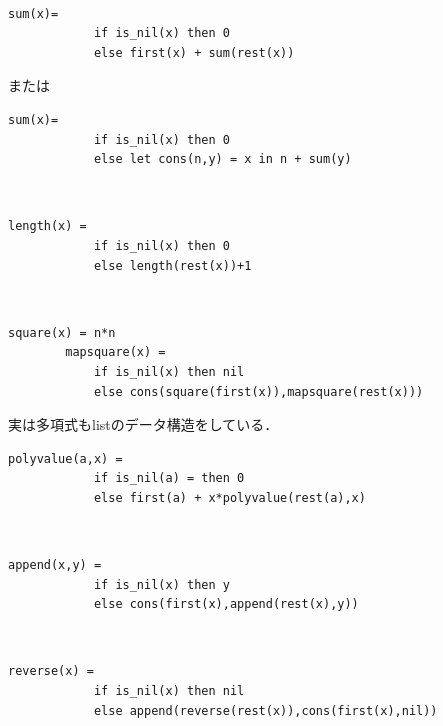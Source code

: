 \documentclass[uplatex, dvipdfmx]{jsreport}
\begin{document}
\begin{example}[和]　

    \begin{lstlisting}[caption=sum]
        sum(x)=
            if is_nil(x) then 0
            else first(x) + sum(rest(x))
    \end{lstlisting}
    または
    \begin{lstlisting}[caption=sum]
        sum(x)=
            if is_nil(x) then 0
            else let cons(n,y) = x in n + sum(y)
    \end{lstlisting}
\end{example}

\begin{example}[長さ]　

    \begin{lstlisting}[caption=length]
        length(x) =
            if is_nil(x) then 0
            else length(rest(x))+1
    \end{lstlisting}
\end{example}

\begin{example}　\label{example-pointwise-square}

    \begin{lstlisting}[caption=point-wise square]
        square(x) = n*n
        mapsquare(x) =
            if is_nil(x) then nil
            else cons(square(first(x)),mapsquare(rest(x)))
    \end{lstlisting}
\end{example}

\begin{example}
    実は多項式もlistのデータ構造をしている．
    \begin{lstlisting}[caption=Horner's polynomial]
        polyvalue(a,x) =
            if is_nil(a) = then 0
            else first(a) + x*polyvalue(rest(a),x)
    \end{lstlisting}
\end{example}

\begin{example}[append]　\label{example-append-on-Nlist}

    \begin{lstlisting}[caption=append]
        append(x,y) =
            if is_nil(x) then y
            else cons(first(x),append(rest(x),y))
    \end{lstlisting}
\end{example}

\begin{example}[reverse]　

    \begin{lstlisting}[caption=reverse]
        reverse(x) =
            if is_nil(x) then nil
            else append(reverse(rest(x)),cons(first(x),nil))
    \end{lstlisting}
\end{example}
\end{document}
